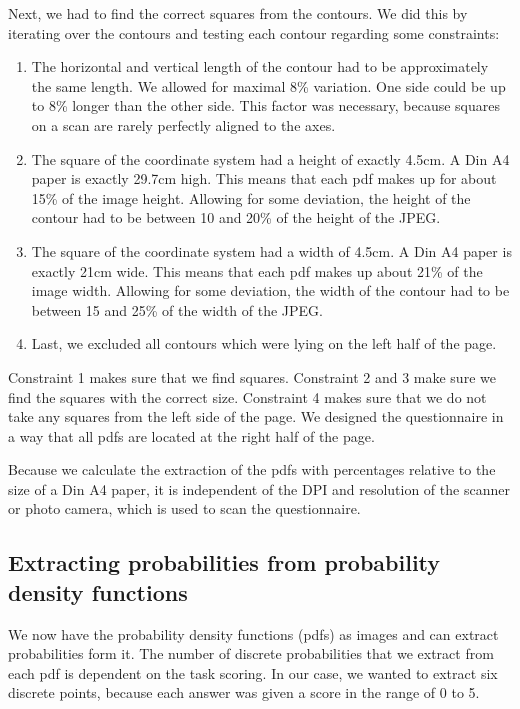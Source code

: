 \documentclass[../main/main.tex]{subfiles}
\begin{document}
	Next, we had to find the correct squares from the contours. We did this by iterating over the contours and testing each contour regarding some constraints:
	
	\begin{enumerate}
		\item The horizontal and vertical length of the contour had to be approximately the same length. We allowed for maximal 8\% variation. One side could be up to 8\% longer than the other side. This factor was necessary, because squares on a scan are rarely perfectly aligned to the axes.
		\item The square of the coordinate system had a height of exactly 4.5cm. A Din A4 paper is exactly 29.7cm high. This means that each pdf makes up for about 15\% of the image height. Allowing for some deviation, the height of the contour had to be between 10 and 20\% of the height of the JPEG. 
		\item The square of the coordinate system had a width of 4.5cm. A Din A4 paper is exactly 21cm wide. This means that each pdf makes up about 21\% of the image width. Allowing for some deviation, the width of the contour had to be between 15 and 25\% of the width of the JPEG. 
		\item Last, we excluded all contours which were lying on the left half of the page.
	\end{enumerate}

	\noindent Constraint 1 makes sure that we find squares. Constraint 2 and 3 make sure we find the squares with the correct size. Constraint 4 makes sure that we do not take any squares from the left side of the page. We designed the questionnaire in a way that all pdfs are located at the right half of the page.
	
	Because we calculate the extraction of the pdfs with percentages relative to the size of a Din A4 paper, it is independent of the DPI and resolution of the scanner or photo camera, which is used to scan the questionnaire.
	
	\subsection{Extracting probabilities from probability density functions}
	
	We now have the probability density functions (pdfs) as images and can extract probabilities form it. The number of discrete probabilities that we extract from each pdf is dependent on the task scoring. In our case, we wanted to extract six discrete points, because each answer was given a score in the range of 0 to 5. 
	
\end{document}
